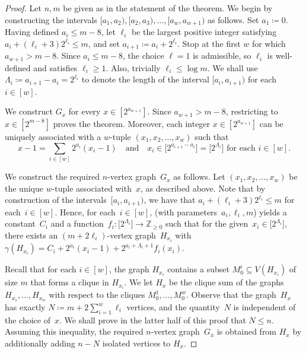 \documentclass[10pt,a4paper]{amsart}
\begin{document}
\begin{proof}
    \setcounter{equation}{0}
    Let $n, m$ be given as in the statement of the theorem. We begin by constructing the intervals $[a_1,a_2), [a_2,a_3),\dots,[a_w,a_{w+1})$ as follows. Set $a_1\coloneqq0$. Having defined $a_i\le m-8$, let $\ell_i$ be the largest positive integer satisfying $a_{i}+(\ell_i+3)2^{\ell_i}\leq m$, and set     
    $a_{i+1} \coloneqq a_{i}+2^{\ell_i}$. Stop at the first $w$ for  which $a_{w+1}>m-8$. Since $a_i\le m-8$, the choice $\ell=1$ is admissible, so $\ell_i$ is well-defined and satisfies $\ell_i \geq 1$. Also, trivially  $\ell_i\leq \log m$. We shall use~$\Lambda_i\coloneqq a_{i+1}-a_i = 2^{\ell_i}$ to denote the length of the interval $[a_i, a_{i+1})$ for each $i \in [w]$.

    We construct $G_x$ for every $x\in[2^{a_{w+1}}]$.
Since $a_{w+1}>m-8$, restricting to
$x\in[2^{m-8}]$ proves the theorem. Moreover, each integer $x \in [2^{a_{w+1}}]$ can be uniquely associated with a $w$-tuple $(x_1, x_2, \dots, x_w)$ such that 
    \begin{equation}
        x-1=\sum_{i \in [w]} 2^{a_i}(x_i-1)\quad \text{and} \quad x_i\in \bigl[2^{a_{i+1}-a_i}\bigr] = \bigl[2^{\Lambda_i}\bigr] \text{ for each $i \in [w]$.}\label{eqTH1}
    \end{equation} 
    
    We construct the required $n$-vertex graph~$G_x$ as follows. Let $(x_1, x_2, \dots, x_w)$ be the unique $w$-tuple associated with~$x$, as described above. Note that by construction of the intervals~$[a_i, a_{i+1})$, we have that $a_i + (\ell_i + 3)2^{\ell_i} \leq m$ for each~$i \in [w]$. Hence, for each~$i \in [w]$,  (with parameters~$a_i, \ell_i,m$) yields a constant~$C_i$ and a function~$f_i:\bigl[2^{\Lambda_i}\bigr]\to \mathbb{Z}_{\ge0}$ such that for the given~$x_i\in \bigl[2^{\Lambda_i}\bigr]$, there exists an $(m+2\ell_i)$-vertex graph~$H_{x_i}$ with $ \gamma(H_{x_i}) = C_i+2^{a_i}(x_i-1)+2^{a_i+\Lambda_i+1}f_i(x_i)$.

    Recall that for each $i \in [w]$, the graph $H_{x_i}$ contains a subset $M^i_0\subseteq V(H_{x_i})$ of size $m$ that forms a clique in $H_{x_i}$. We let $H_x$ be the clique sum of the graphs $H_{x_1}, \dots, H_{x_w}$ with respect to the cliques $M_0^1, \dots, M_0^w$. Observe that the graph~$H_x$ has exactly  $N \coloneqq m+2\sum_{i=1}^w \ell_i$ vertices, and the quantity~$N$ is independent of the choice of~$x$. We shall prove in the latter half of this proof that $N \leq n$. Assuming this inequality, the required $n$-vertex graph~$G_x$ is obtained from $H_x$ by additionally adding $n-N$ isolated vertices to $H_x$. 


\end{proof}
\end{document}
